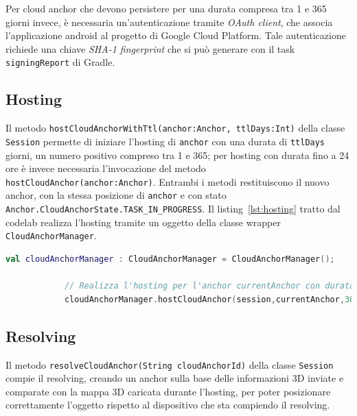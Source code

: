 \documentclass[crop=false, class=book]{standalone}
\begin{document}
	\noindent
	Per cloud anchor che devono persistere per una durata compresa tra 1 e 365 giorni invece, è necessaria un'autenticazione tramite \textit{OAuth client}, che associa l'applicazione android al progetto di Google Cloud Platform. Tale autenticazione richiede una chiave \textit{SHA-1 fingerprint} che si può generare con il task \verb|signingReport| di Gradle.
	
	\subsection{Hosting}
	Il metodo \verb|hostCloudAnchorWithTtl(anchor:Anchor, ttlDays:Int)| della classe \verb|Session| permette di iniziare l'hosting di \verb|anchor| con una durata di \verb|ttlDays| giorni, un numero positivo compreso tra 1 e 365; per hosting con durata fino a 24 ore è invece necessaria l'invocazione del metodo \verb|hostCloudAnchor(anchor:Anchor)|. Entrambi i metodi restituiscono il nuovo anchor, con la stessa posizione di \verb|anchor| e con stato \verb|Anchor.CloudAnchorState.TASK_IN_PROGRESS|. Il listing~\vref{lst:hosting} tratto dal codelab \cite{codelab2021cloud} realizza l'hosting tramite un oggetto della classe wrapper \verb|CloudAnchorManager|.
	
	\begin{center}
		\begin{minipage}{0.95\textwidth}
			\begin{lstlisting}[caption={Hosting di un cloud anchor.}, label={lst:hosting}, language=Kotlin]
			val cloudAnchorManager : CloudAnchorManager = CloudAnchorManager();
				
			// Realizza l'hosting per l'anchor currentAnchor con durata 300 giorni
			cloudAnchorManager.hostCloudAnchor(session,currentAnchor,300,this::onHostedAnchorAvailable);
			\end{lstlisting}
		\end{minipage}
	\end{center}
	
	\subsection{Resolving}
	Il metodo \verb|resolveCloudAnchor(String cloudAnchorId)| della classe \verb|Session| compie il resolving, creando un anchor sulla base delle informazioni 3D inviate e comparate con la mappa 3D caricata durante l'hosting, per poter posizionare correttamente l'oggetto rispetto al dispositivo che sta compiendo il resolving.

	
\end{document}
